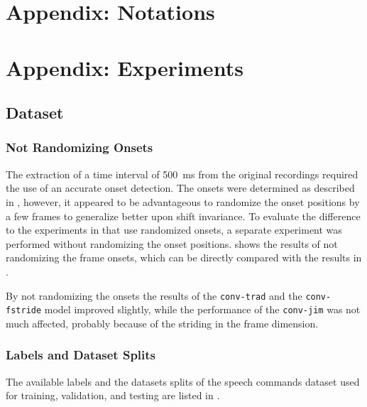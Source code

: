 



\chapter{Appendix: Notations}




\chapter{Appendix: Experiments}

\section{Dataset}

\subsection{Not Randomizing Onsets}
The extraction of a time interval of \SI{500}{\milli\second} from the original recordings required the use of an accurate onset detection.
The onsets were determined as described in , however, it appeared to be advantageous to randomize the onset positions by a few frames to generalize better upon shift invariance.
To evaluate the difference to the experiments in  that use randomized onsets, a separate experiment was performed without randomizing the onset positions.
 shows the results of not randomizing the frame onsets, which can be directly compared with the results in .

By not randomizing the onsets the results of the \texttt{conv-trad} and the \texttt{conv-fstride} model improved slightly, while the performance of the \texttt{conv-jim} was not much affected, probably because of the striding in the frame dimension.

\subsection{Labels and Dataset Splits}
The available labels and the datasets splits of the speech commands dataset \cite{Warden2018SpeechCommands} used for training, validation, and testing are listed in .




